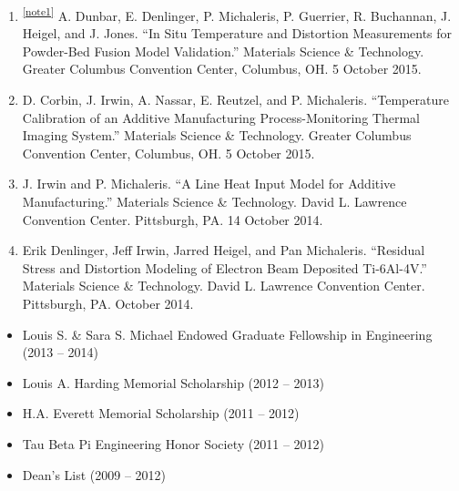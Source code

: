 \documentclass[10.5pt,letterpaper]{article}
\begin{document}
\begin{enumerate}[leftmargin=*]
	\item \textsuperscript{\ref{note1}} A. Dunbar, E. Denlinger, P. Michaleris, P. Guerrier, R. Buchannan, J. Heigel, and J. Jones. ``In Situ Temperature and Distortion Measurements for Powder-Bed Fusion Model Validation.'' Materials Science \& Technology. Greater Columbus Convention Center, Columbus, OH. 5 October 2015.
	\item D. Corbin, J. Irwin, A. Nassar, E. Reutzel, and P. Michaleris. ``Temperature Calibration of an Additive Manufacturing Process-Monitoring Thermal Imaging System.'' Materials Science \& Technology. Greater Columbus Convention Center, Columbus, OH. 5 October 2015.
	\item J. Irwin and P. Michaleris. ``A Line Heat Input Model for Additive Manufacturing.'' Materials Science \& Technology. David L. Lawrence Convention Center. Pittsburgh, PA. 14 October 2014.
	\item Erik Denlinger, Jeff Irwin, Jarred Heigel, and Pan Michaleris.  ``Residual Stress and Distortion Modeling of Electron Beam Deposited Ti-6Al-4V.''  Materials Science \& Technology.  David L. Lawrence Convention Center.  Pittsburgh, PA.  October 2014.
\end{enumerate}

\spacedhrule{0.5em}{-0.5em}
\begin{itemize}
	\setlength{\parskip}{0em}
	\item Louis S. \& Sara S. Michael Endowed Graduate Fellowship in Engineering (2013 -- 2014)
	\item Louis A. Harding Memorial Scholarship (2012 -- 2013)
	\item H.A. Everett Memorial Scholarship (2011 -- 2012)
	\item Tau Beta Pi Engineering Honor Society (2011 -- 2012)
	\item Dean's List (2009 -- 2012)
\end{itemize}
\end{document}
